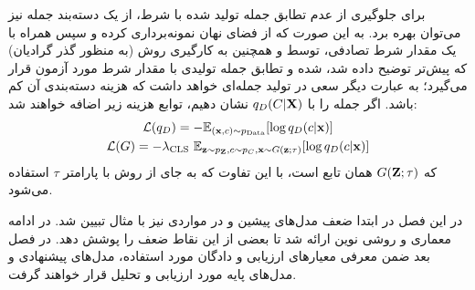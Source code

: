 برای جلوگیری از عدم تطابق جمله تولید شده با شرط، از یک دسته‌بند جمله نیز می‌توان بهره برد. به این صورت که از فضای نهان نمونه‌برداری کرده و سپس همراه با یک مقدار شرط تصادفی، توسط \decoder{} و همچنین به کارگیری روش  (به منظور گذر گرادیان) که پیش‌تر توضیح داده شد،
 \decode{} 
 شده و تطابق جمله تولیدی با مقدار شرط مورد آزمون قرار می‌گیرد؛ به عبارت دیگر \decoder{} سعی در تولید جمله‌ای خواهد داشت که هزینه دسته‌بندی آن کم باشد.
 اگر \classifier{} جمله را با $q_D(C|{\bf X})$ نشان دهیم، توابع هزینه زیر اضافه خواهند شد:
 \begin{gather}
 {\mathcal{L}}(q_D) = -\mathbb E_{({\bf x},c) \sim p_\text{Data}} [\log q_D(c|{\bf x})]
 \\
 {\mathcal{L}}(G) = -\lambda_\text{CLS} ~\mathbb E_{{\bf z} \sim p_{\bf Z}, c \sim p_C, {\bf x} \sim G({\bf z};\tau)} [\log q_D(c|{\bf x})]
 \end{gather}
که $G({\bf Z}; \tau)$ همان تابع \decoder{} است، با این تفاوت که به جای \greedydecoding{} از روش  با پارامتر $\tau{}$ استفاده می‌شود.

در این فصل در ابتدا ضعف مدل‌های پیشین و در مواردی نیز با مثال تبیین شد. در ادامه معماری و روشی نوین ارائه شد تا بعضی از این نقاط ضعف را پوشش دهد. در فصل بعد ضمن معرفی معیارهای ارزیابی و دادگان مورد استفاده، مدل‌های پیشنهادی و مدل‌های پایه مورد ارزیابی و تحلیل قرار خواهند گرفت.

